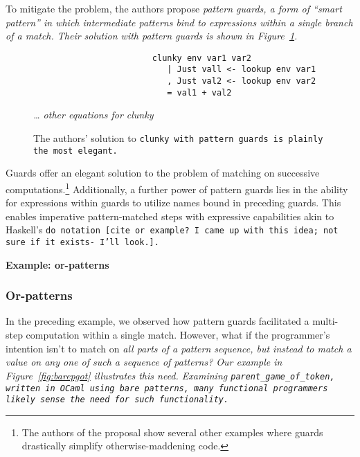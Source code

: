 \documentclass[manuscript,screen,review, 12pt]{acmart}
\begin{document}
\begin{outline}[enumerate]
        To mitigate the problem, the authors propose \it{pattern guards}, a form
        of “smart pattern” in which intermediate patterns bind to
        expressions within a single branch of a match. Their solution with
        pattern guards is shown in Figure~\ref{fig:guardclunky}. 

    \begin{figure}[hbt!]  
        \begin{center}
        \begin{verbatim}
                        clunky env var1 var2    
                           | Just vall <- lookup env var1
                           , Just val2 <- lookup env var2
                           = val1 + val2
        \end{verbatim}
        \it{… other equations for clunky}
        \end{center}    
    \caption{The authors' solution to \tt{clunky} with pattern guards is plainly
    the most elegant.} 
    \label{fig:guardclunky}
    \end{figure}

    Guards offer an elegant solution to the problem of matching on successive
    computations.\footnote{The authors of the proposal show several other
    examples where guards drastically simplify otherwise-maddening code.}
    Additionally, a further power of pattern guards lies in the ability for
    expressions within guards to utilize names bound in preceding guards. This
    enables imperative pattern-matched steps with expressive capabilities akin
    to Haskell's \tt{do} notation [cite or example? I came up with this idea;
    not sure if it exists- I'll look.]. 

        \2 \bf{Example: or-patterns}

\subsubsection{Or-patterns}

        In the preceding example, we observed how pattern guards facilitated a
        multi-step computation within a single match. However, what if the
        programmer's intention isn't to match on \it{all} parts of a pattern
        sequence, but instead to match a value on \it{any one} of such a
        sequence of patterns? Our example in Figure~\ref{fig:barepgot}
        illustrates this need. Examining \tt{parent\_game\_of\_token}, written
        in OCaml using bare patterns, many functional programmers likely sense
        the need for such functionality.
        

\end{outline}
\end{document}
